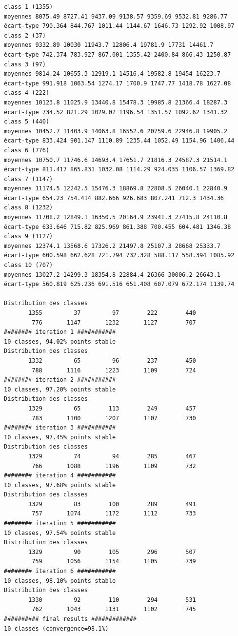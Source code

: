 \documentclass[environments,article,submit,pdftex,moreauthors]{Definitions/mdpi}
\begin{document}
\begin{scriptsize}
\begin{verbatim}
class 1 (1355)
moyennes 8075.49 8727.41 9437.09 9138.57 9359.69 9532.81 9286.77
écart-type 790.364 844.767 1011.44 1144.67 1646.73 1292.92 1008.97
class 2 (37)
moyennes 9332.89 10030 11943.7 12806.4 19781.9 17731 14461.7
écart-type 742.374 783.927 867.001 1355.42 2400.84 866.43 1250.87
class 3 (97)
moyennes 9814.24 10655.3 12919.1 14516.4 19582.8 19454 16223.7
écart-type 991.918 1063.54 1274.17 1700.9 1747.77 1418.78 1627.08
class 4 (222)
moyennes 10123.8 11025.9 13440.8 15478.3 19985.8 21366.4 18287.3
écart-type 734.52 821.29 1029.02 1196.54 1351.57 1092.62 1341.32
class 5 (440)
moyennes 10452.7 11403.9 14063.8 16552.6 20759.6 22946.8 19905.2
écart-type 833.424 901.147 1110.89 1235.44 1052.49 1154.96 1406.44
class 6 (776)
moyennes 10750.7 11746.6 14693.4 17651.7 21816.3 24587.3 21514.1
écart-type 811.417 865.831 1032.08 1114.29 924.035 1106.57 1369.82
class 7 (1147)
moyennes 11174.5 12242.5 15476.3 18869.8 22808.5 26040.1 22840.9
écart-type 654.23 754.414 882.666 926.683 807.241 712.3 1434.36
class 8 (1232)
moyennes 11708.2 12849.1 16350.5 20164.9 23941.3 27415.8 24110.8
écart-type 633.646 715.82 825.969 861.388 700.455 604.481 1346.38
class 9 (1127)
moyennes 12374.1 13568.6 17326.2 21497.8 25107.3 28668 25333.7
écart-type 600.598 662.628 721.794 732.328 588.117 558.394 1085.92
class 10 (707)
moyennes 13027.2 14299.3 18354.8 22884.4 26366 30006.2 26643.1
écart-type 560.819 625.236 691.516 651.408 607.079 672.174 1139.74

Distribution des classes
       1355         37         97        222        440
        776       1147       1232       1127        707
######## iteration 1 ###########
10 classes, 94.02% points stable
Distribution des classes
       1332         65         96        237        450
        788       1116       1223       1109        724
######## iteration 2 ###########
10 classes, 97.20% points stable
Distribution des classes
       1329         65        113        249        457
        783       1100       1207       1107        730
######## iteration 3 ###########
10 classes, 97.45% points stable
Distribution des classes
       1329         74         94        285        467
        766       1088       1196       1109        732
######## iteration 4 ###########
10 classes, 97.68% points stable
Distribution des classes
       1329         83        100        289        491
        757       1074       1172       1112        733
######## iteration 5 ###########
10 classes, 97.54% points stable
Distribution des classes
       1329         90        105        296        507
        759       1056       1154       1105        739
######## iteration 6 ###########
10 classes, 98.10% points stable
Distribution des classes
       1330         92        110        294        531
        762       1043       1131       1102        745
########## final results #############
10 classes (convergence=98.1%)


\end{verbatim}
\end{scriptsize}
\end{document}
